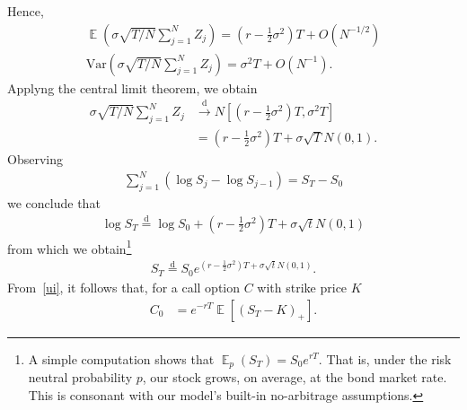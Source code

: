 \documentclass[12pt]{amsbook}
\DeclareMathOperator{\ex}{\mathbb{E}}
\newcommand{\var}{\mathrm{Var}}
\theoremstyle{plain}
\theoremstyle{definition}
\theoremstyle{remark}
\numberwithin{equation}{section}  %
\begin{document}
Hence,
\begin{gather*}
	\ex (\sigma \sqrt{T/N} \sum_{j=1}^{N} Z_{j}) =
	\left( r - \frac{1}{2} \sigma^{2} \right) T + O(N^{-1/2})
	\\
	\var (\sigma \sqrt{T/N} \sum_{j=1}^{N} Z_{j}) =
	\sigma^{2}T + O(N^{-1}).
\end{gather*}
Applyng the central limit theorem, we obtain
\begin{equation*}
	\begin{split}
		\sigma \sqrt{T/N} \sum_{j=1}^{N} Z_{j} 
		& \xrightarrow{\text{d}}
		N \left [\left(r - \frac{1}{2} \sigma^{2} \right )T, \sigma^{2}T \right]
		\\
		& = \left(r - \frac{1}{2} \sigma^{2} \right)T + \sigma \sqrt{T} N(0,1).
	\end{split}
\end{equation*}
Observing 
\begin{equation*}
	\begin{split}
		\sum_{j=1}^{N} \left( \log S_{j} - \log S_{j-1} \right) = S_{T} - S_{0}
	\end{split}
\end{equation*}
we conclude that
\begin{equation*}
	\begin{split}
		\log S_{T} \overset{\text{d}}{=} 
		\log S_{0}  + \left( r - \frac{1}{2} \sigma^{2} \right)T
		+ \sigma \sqrt{t} N(0,1)
	\end{split}
\end{equation*}
from which we obtain\footnote{A simple computation shows that
	$\ex_{p}(S_{T}) = S_{0}e^{rT}.$
	That is, under the risk neutral probability $p$, our stock grows, on average,
	at the bond market rate. This is consonant with our model's built-in
no-arbitrage assumptions.}
\begin{equation*}
	\begin{split}
		S_{T} \overset{\text{d}}{=} 
		S_{0} e^{\left( r - \frac{1}{2} \sigma^{2} \right)T + \sigma
		\sqrt{t}N(0,1)}.
	\end{split}
\end{equation*}
From~\eqref{ui}, it follows that, for a call option $C$ with strike
price $K$
\begin{equation*}
	\begin{split}
		C_{0} & =  e^{-rT} \ex \left [{\left( S_{T} - K \right)}_{+} \right ].
	\end{split}
\end{equation*}
\end{document}
